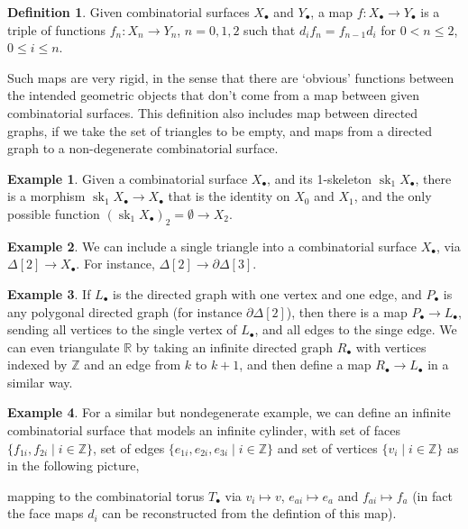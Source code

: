 \documentclass{tufte-handout}
\def\RR{\mathbb{R}}
\def\ZZ{\mathbb{Z}}
\DeclareMathOperator{\sk}{sk}
\theoremstyle{definition}
\newtheorem{definition}{Definition}
\newtheorem{example}{Example}
\begin{document}
\begin{definition}
Given combinatorial surfaces $X_\bullet$ and $Y_\bullet$, a map $f\colon X_\bullet\to Y_\bullet$ 
is a triple of functions $f_n\colon X_n\to Y_n$, $n=0,1,2$ such that $d_if_n = f_{n-1}d_i$ for $0<n\leq 2$, $0\leq i \leq n$.
\end{definition}

Such maps are very rigid, in the sense that there are `obvious' functions between the intended
geometric objects that don't come from a map between given combinatorial surfaces. This
definition also includes map between directed graphs, if we take the set of triangles
to be empty, and maps from a directed graph to a non-degenerate combinatorial surface.

\begin{example}
Given a combinatorial surface $X_\bullet$, and its 1-skeleton $\sk_1 X_\bullet$, there is a morphism
$\sk_1X_\bullet\to X_\bullet$ that is the identity on $X_0$ and $X_1$, and the only possible 
function $(\sk_1X_\bullet)_2 = \emptyset \to X_2$. 
\end{example}

\begin{example}
We can include a single triangle into a combinatorial surface $X_\bullet$, via 
$\Delta[2] \to X_\bullet$. For instance, $\Delta[2] \to \partial\Delta[3]$.
\end{example}

\begin{example}
If $L_\bullet$ is the directed graph with one vertex and one edge, and $P_\bullet$ is any
polygonal 
directed graph (for instance $\partial\Delta[2]$), then there is a map
$P_\bullet \to L_\bullet$, sending all vertices to the single vertex of $L_\bullet$, and
all edges to the singe edge. We can even triangulate $\RR$ by taking an infinite directed 
graph $R_\bullet$  with vertices indexed by $\ZZ$ and an edge from $k$ to $k+1$, and then
define a map $R_\bullet \to L_\bullet$ in a similar way.
\end{example}

\begin{example}\label{eg:infinite_cylinder}
For a similar but nondegenerate example, we can define an infinite combinatorial surface that
models an infinite cylinder, with set of faces $\{f_{1i},f_{2i}\mid i \in \ZZ\}$, set of 
edges $\{e_{1i},e_{2i},e_{3i}\mid i\in \ZZ\}$ and set of vertices $\{v_i\mid i\in \ZZ\}$ as
in the following picture,

\begin{center}
\end{center}

\noindent mapping to the combinatorial torus $T_\bullet$ via $v_i\mapsto v$, 
$e_{ai}\mapsto e_a$ and $f_{ai} \mapsto f_a$ (in fact the face maps $d_i$ can be reconstructed
from the defintion of this map).
\end{example}
\end{document}
